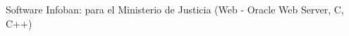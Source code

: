 \begin{entrylist}
{Software Infoban: para el Ministerio de Justicia (Web - Oracle Web Server, C,
C++)



}

  \end{entrylist}
